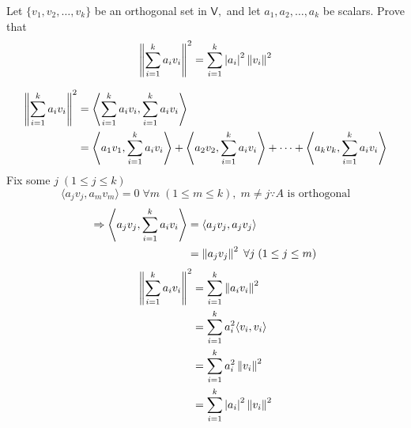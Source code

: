 Let $\{v_1,v_2,\dotsc,v_k\}$ be an orthogonal set in $\mathsf{V},$ and
let $a_1,a_2,\dotsc,a_k$ be scalars. Prove that
\[
\left\lVert\sum\limits_{i=1}^ka_iv_i\right\rVert^2 = \sum\limits_{i=1}^k \left\lvert a_i
\right\rvert^2 \left\lVert v_i\right\rVert^2
\]

\begin{align}
\left\lVert\sum\limits_{i=1}^ka_iv_i\right\rVert^2 &= \left\langle
  \sum\limits_{i=1}^ka_iv_i, \sum\limits_{i=1}^ka_iv_i\right\rangle\\
&= \left\langle a_1v_1, \sum\limits_{i=1}^ka_iv_i \right\rangle +
\left\langle a_2v_2, \sum\limits_{i=1}^ka_iv_i \right\rangle + \dotsb
+ \left\langle a_kv_k, \sum\limits_{i=1}^ka_iv_i \right\rangle 
\end{align}
Fix some $j\; (1\leq j\leq k)$
\begin{equation}
\langle a_jv_j,a_mv_m\rangle = 0 \; \forall m \; (1\leq m\leq k), \;
m \neq j \because A \text{ is orthogonal}
\end{equation}
\begin{align}
\Rightarrow \left\langle a_jv_j, \sum\limits_{i=1}^ka_iv_i \right\rangle
&= \langle a_jv_j,a_jv_j\rangle\\
&= \left\lVert a_jv_j\right\rVert^2 \; \forall j \; (1\leq j\leq m)
\end{align}
\begin{align}
\left\lVert\sum\limits_{i=1}^ka_iv_i\right\rVert^2 &=  \sum\limits_{i=1}^k
\left\lVert a_iv_i\right\rVert^2\\
&= \sum\limits_{i=1}^ka_i^2 \langle v_i,v_i\rangle\\
&= \sum\limits_{i=1}^ka_i^2 \left\lVert v_i\right\rVert^2 \\
&= \sum\limits_{i=1}^k\left\lvert a_i\right\rvert^2 \left\lVert v_i\right\rVert^2 \\
\end{align}
